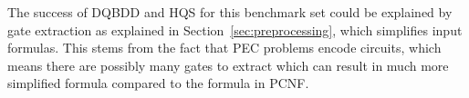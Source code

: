 \documentclass[
  digital, %
  color,
  twoside, %
  table,   %
  nolof,     %
  nolot,     %
]{fithesis3}
\theoremstyle{definition}
\theoremstyle{remark}
\begin{document}
The success of DQBDD and HQS for this benchmark set could be explained by gate extraction as explained in Section~\ref{sec:preprocessing}, which simplifies input formulas. This stems from the fact that PEC problems encode circuits, which means there are possibly many gates to extract which can result in much more simplified formula compared to the formula in PCNF.

\begin{table}[ht]
\centering
\caption{Comparison of solvers for PEC2 benchmark set}%
\label{tab:PEC2}
\end{table}
\end{document}
